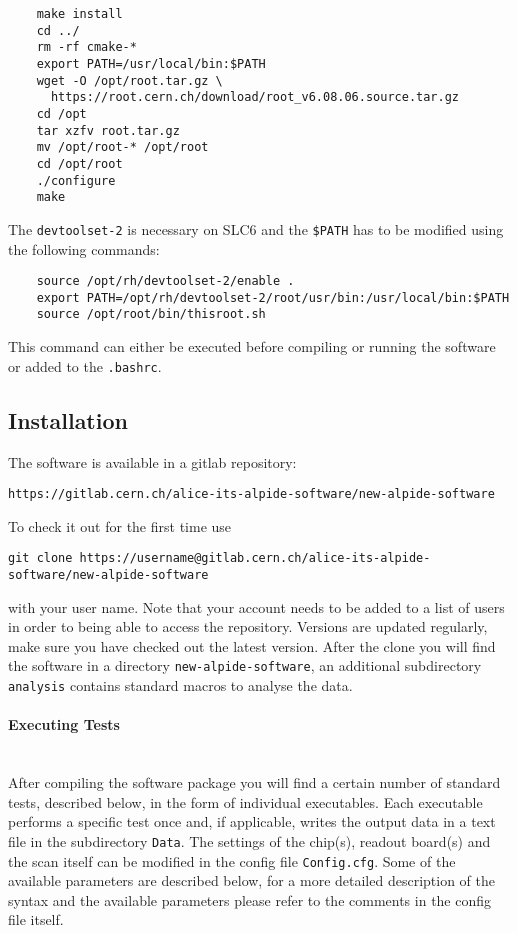\documentclass{article}
\begin{document}
\begin{itemize}
\begin{lstlisting}
    make install
    cd ../
    rm -rf cmake-*
    export PATH=/usr/local/bin:$PATH
    wget -O /opt/root.tar.gz \
      https://root.cern.ch/download/root_v6.08.06.source.tar.gz
    cd /opt
    tar xzfv root.tar.gz
    mv /opt/root-* /opt/root
    cd /opt/root
    ./configure
    make
  \end{lstlisting}
  \newpage
  The \texttt{devtoolset-2} is necessary on SLC6 and the \texttt{\$PATH} has to be modified using the following commands:
  \begin{lstlisting}
    source /opt/rh/devtoolset-2/enable .
    export PATH=/opt/rh/devtoolset-2/root/usr/bin:/usr/local/bin:$PATH
    source /opt/root/bin/thisroot.sh
  \end{lstlisting}
  This command can either be executed before compiling or running the software or added to the \texttt{.bashrc}.
\end{itemize}

\subsection{Installation}
The software is available in a gitlab repository:

\begin{lstlisting}
https://gitlab.cern.ch/alice-its-alpide-software/new-alpide-software
\end{lstlisting}

To check it out for the first time use

\begin{lstlisting}
git clone https://username@gitlab.cern.ch/alice-its-alpide-software/new-alpide-software
\end{lstlisting}

with your user name. Note that your account needs to be added to a
list of users in order to being able to access the repository.
Versions are updated regularly, make sure you have checked out the
latest version. After the clone you will find the software in a directory \texttt{new-alpide-software}, an additional subdirectory \texttt{analysis} contains standard macros to analyse the data.

\paragraph{Executing Tests}\hfill \\
After compiling the software package you will find a certain number of standard tests, described below, in the form of individual executables. Each executable performs a specific test once and, if applicable, writes the output data in a text file in the subdirectory \texttt{Data}. The settings of the chip(s), readout board(s) and the scan itself can be modified in the config file \texttt{Config.cfg}. Some of the available parameters are described below, for a more detailed description of the syntax and the available parameters please refer to the comments in the config file itself.
\end{document}
